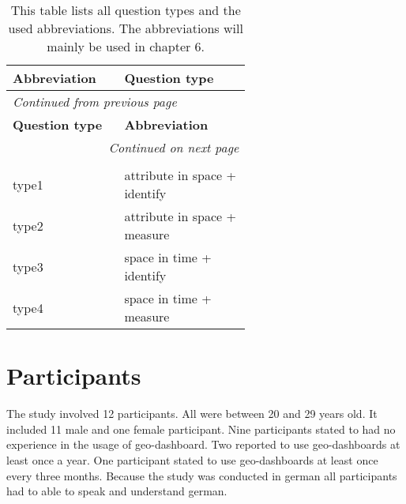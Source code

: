 \begin{longtable}{| p{0.20\linewidth} | p{0.40\linewidth}|}
    \hline
    \textbf{Abbreviation} & \textbf{Question type} \\
    \hline
    \endfirsthead
    \multicolumn{2}{l}{{\textit{Continued from previous page}}} \\
    \hline
    \textbf{Question type} & \textbf{Abbreviation} \\
    \hline
    \endhead
    \hline \multicolumn{2}{r}{{\textit{Continued on next page}}} \\
    \endfoot
    \hline
    \caption{This table lists all question types and the used abbreviations. The abbreviations will mainly be used in chapter 6. \label{questionTypesTable}}\\
    \endlastfoot
    type1 & attribute in space + identify \\
    \hline
    type2 & attribute in space + measure \\
    \hline
    type3 & space in time + identify \\
    \hline
    type4 & space in time + measure\\
\end{longtable}

\section{Participants}
The study involved 12 participants. All were between 20 and 29 years old. It included 11 male and one female participant. Nine
participants stated to had no experience in the usage of geo-dashboard. Two reported to use geo-dashboards at least once a year. One participant
stated to use geo-dashboards at least once every three months. Because the study was conducted in german all participants had to able to speak
and understand german.

